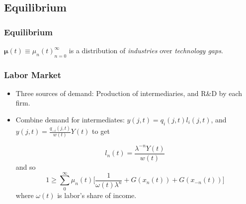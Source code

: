 \documentclass{beamer}
\begin{document}



\subsection{Equilibrium}
\label{sub:equilibrium}
\begin{frame}[t]\frametitle{Equilibrium} 

  $\bm{\mu}(t) \equiv {\mu_n(t)}_{n=0}^\infty$ is a distribution of \emph{industries} over \emph{technology gaps}.
  

\end{frame}

\begin{frame}[t]\frametitle{Labor Market} 
  \begin{itemize}
    \item Three sources of demand: Production of intermediaries, and R\&D by each firm.
    \item Combine demand for intermediates: $y(j, t) = q_i(j, t)l_i(j, t)$, and $y(j, t) = \frac{q_{-i}(j, t)}{w(t)}Y(t)$ to get

      \begin{equation}
        l_n(t) = \frac{\lambda^{-n}Y(t)}{w(t)}
      \end{equation}
    and so
      \begin{equation} \label{eq:labor_clearing}
        1 \geq \sum_0^{\infty} \mu_n(t) \Big[\frac{1}{\omega(t)\lambda^n} + G(x_n(t))    + G(x_{-n}(t))\Big]
      \end{equation}
      where $\omega(t)$ is labor's share of income.

  \end{itemize}
\end{frame}
\end{document}
